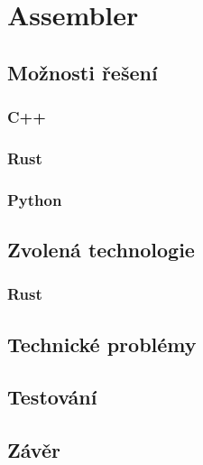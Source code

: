 \chapter{Assembler}

\blind[1]

\section{Možnosti řešení}

\blind[1]

\subsection{C++}

\blind[3]

\subsection{Rust}

\blind[3]

\subsection{Python}

\blind[2]

\section{Zvolená technologie}

\subsection{Rust}

\blind[2]

\section{Technické problémy}

\blind[4]

\section{Testování}

\blind[2]

\section{Závěr}

\blind[1]